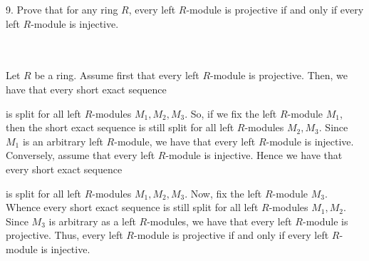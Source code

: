 9. Prove that for any ring $R$, every left $R$-module is projective if and only if every left $R$-module
is injective.\\\\

\begin{solution}\renewcommand{\qedsymbol}{}\ \\
    Let $R$ be a ring. Assume first that every left $R$-module is projective. Then, we have that every
    short exact sequence

    \begin{center}
    \end{center}

    is split for all left $R$-modules $M_1, M_2, M_3$. So, if we fix the left $R$-module $M_1$, then the
    short exact sequence is still split for all left $R$-modules $M_2, M_3$. Since $M_1$ is an arbitrary
    left $R$-module, we have that every left $R$-module is injective. Conversely, assume that every left
    $R$-module is injective. Hence we have that every short exact sequence

    \begin{center}
    \end{center}

    is split for all left $R$-modules $M_1, M_2, M_3$. Now, fix the left $R$-module $M_3$. Whence every
    short exact sequence is still split for all left $R$-modules $M_1, M_2$. Since $M_3$ is arbitrary as
    a left $R$-modules, we have that every left $R$-module is projective. Thus, every left $R$-module is
    projective if and only if every left $R$-module is injective.

\end{solution}